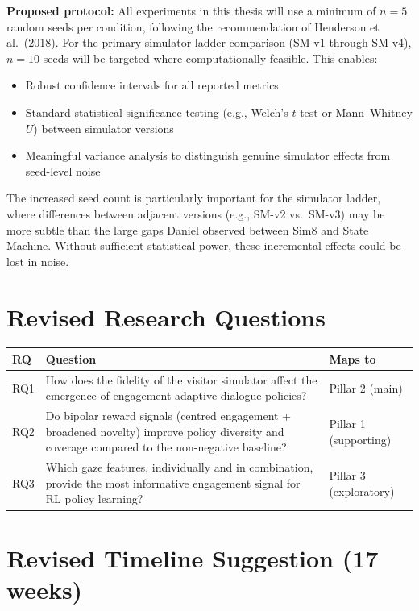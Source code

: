 \documentclass[11pt,a4paper]{article}
\begin{document}
\textbf{Proposed protocol:} All experiments in this thesis will use a minimum of $n = 5$ random seeds per condition, following the recommendation of Henderson et al.\ (2018). For the primary simulator ladder comparison (SM-v1 through SM-v4), $n = 10$ seeds will be targeted where computationally feasible. This enables:

\begin{itemize}
    \item Robust confidence intervals for all reported metrics
    \item Standard statistical significance testing (e.g., Welch's $t$-test or Mann--Whitney $U$) between simulator versions
    \item Meaningful variance analysis to distinguish genuine simulator effects from seed-level noise
\end{itemize}

\noindent The increased seed count is particularly important for the simulator ladder, where differences between adjacent versions (e.g., SM-v2 vs.\ SM-v3) may be more subtle than the large gaps Daniel observed between Sim8 and State Machine. Without sufficient statistical power, these incremental effects could be lost in noise.


\section{Revised Research Questions}

\begin{table}[h]
\centering
\begin{tabularx}{\textwidth}{l X l}
\toprule
\textbf{RQ} & \textbf{Question} & \textbf{Maps to} \\
\midrule
RQ1 & How does the fidelity of the visitor simulator affect the emergence of engagement-adaptive dialogue policies? & Pillar 2 (main) \\
\addlinespace
RQ2 & Do bipolar reward signals (centred engagement + broadened novelty) improve policy diversity and coverage compared to the non-negative baseline? & Pillar 1 (supporting) \\
\addlinespace
RQ3 & Which gaze features, individually and in combination, provide the most informative engagement signal for RL policy learning? & Pillar 3 (exploratory) \\
\bottomrule
\end{tabularx}
\end{table}


\section{Revised Timeline Suggestion (17 weeks)}
\end{document}
